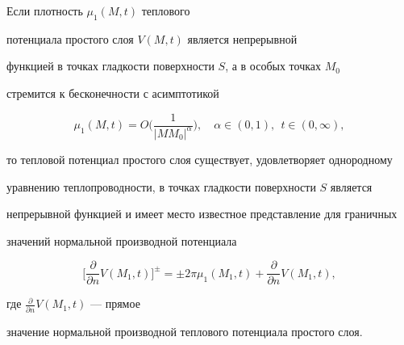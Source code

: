 \begin{thm}


Если плотность $\mu_{1} ({M,t})$ теплового 


потенциала простого слоя $V ({M,t})$ является непрерывной 


функцией в точках гладкости поверхности $S$, а в особых точках $M_{0} $ 


стремится к бесконечности с асимптотикой 


\begin{equation}


\label{eq12}


\mu_{1} ({M,t})=O \bigg({\frac{{1}}{{| {MM_{0}} 


|^{\alpha}}}}\bigg),\quad \alpha \in ({0,1}),\ \ t \in ({0,\infty}),


\end{equation}


то тепловой потенциал простого слоя существует, удовлетворяет однородному 


уравнению теплопроводности, в точках гладкости поверхности $S$ является 


непрерывной функцией и имеет место известное представление для граничных 


значений нормальной производной потенциала


\begin{equation}


\label{eq13}


\bigg[{\frac{{\partial}}{{\partial n}}V ({M_{1} ,t})} 


\bigg]^{\pm}=\pm 2\pi \mu_{1} ({M_{1} ,t})+


\frac{{\partial}}{{\partial n}}V ({M_{1} ,t}),


\end{equation}


где $\frac{{\partial}}{{\partial n}}V ({M_{1} ,t})$ --- прямое 


значение нормальной производной теплового потенциала простого слоя.


\end{thm}









